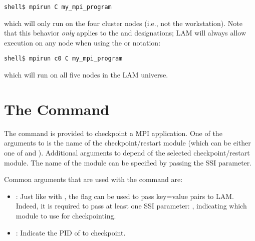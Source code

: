 \lstset{style=lam-cmdline}
\begin{lstlisting}
shell$ mpirun C my_mpi_program
\end{lstlisting}

\noindent which will only run  on the four
cluster nodes (i.e., not the workstation).  
%
Note that this behavior {\em only} applies to the  and 
designations; LAM will always allow execution on any node when using
the  or  notation:

\lstset{style=lam-cmdline}
\begin{lstlisting}
shell$ mpirun c0 C my_mpi_program
\end{lstlisting}

\noindent which will run  on all five nodes
in the LAM universe.


\section{The  Command}
\label{sec:commands-lamcheckpoint}


The  command is provided to checkpoint a MPI
application.  One of the arguments to  is the name
of the checkpoint/restart module (which can be either one of
 and ).  Additional arguments to
 depend of the selected checkpoint/restart module.
The name of the module can be specified by passing the  SSI
parameter.

Common arguments that are used with the  command
are:

\begin{itemize}
\item {}: Just like with , the 
  flag can be used to pass key=value pairs to LAM.  Indeed, it is
  required to pass at least one SSI parameter: ,
  indicating which  module to use for checkpointing.
  
\item {}: Indicate the PID of  to checkpoint.
\end{itemize}

